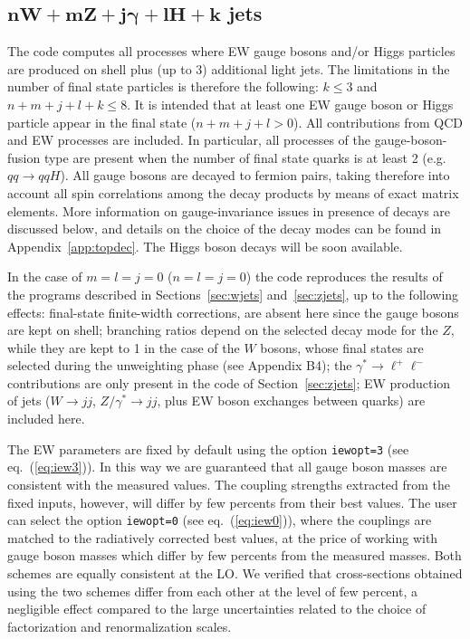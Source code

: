\documentclass[paper]{JHEP3}
\begin{document}
\subsection{$\mathbf{ nW+mZ+j\gamma+lH+k}$ jets}
\label{sec:nw}
The code computes all processes where EW gauge bosons and/or Higgs
particles are produced on shell plus (up to 3) additional light jets.
The limitations in the number of final state particles is therefore
the following: $ k \le 3$ and $n+m+j+l+k \le 8$. It is intended that at
least one EW gauge boson or Higgs particle appear in the final state 
 ($n+m+j+l>0$). All contributions from
QCD and EW processes are included. In particular, all processes of
the gauge-boson-fusion type are present when the number of final state
quarks is at least 2 (e.g. $qq\to qqH$).
All gauge bosons are decayed to fermion pairs, taking therefore into account 
all spin correlations among the decay products by means of exact 
matrix elements. More information on gauge-invariance issues in
presence of decays are discussed below, and details on the choice of
the decay modes can 
be found in Appendix~\ref{app:topdec}. The Higgs boson decays will be soon available. 

In the case of $m=l=j=0$
($n=l=j=0$) the code reproduces the results of the programs described in 
Sections~\ref{sec:wjets} and~\ref{sec:zjets}, up to the following effects:
final-state finite-width corrections, 
are absent here since the gauge bosons are kept on shell; branching
ratios depend on the selected decay mode for the $Z$, while they are
kept to 1 in the case of the $W$ bosons, whose final states are
selected during the unweighting phase (see Appendix B4); 
the $\gamma^* \to \ell^+\ell^- $ contributions are only present in the code
of Section~\ref{sec:zjets}; EW production of jets ($W\to jj$, $Z/\gamma^*
\to jj$, plus EW boson exchanges between quarks) are included here.

The EW parameters are fixed by default using the option {\tt iewopt=3}
(see eq.~(\ref{eq:iew3})). In this way we are guaranteed that all gauge
boson masses are consistent with the measured values. The coupling
strengths extracted from the fixed inputs, however, will differ by few
percents from their best values. The user can select the option 
 {\tt iewopt=0}
(see eq.~(\ref{eq:iew0})), where the couplings are matched to the
radiatively corrected best values, at the price of working with gauge
boson masses which differ by few percents from the measured
masses. Both schemes are equally consistent at the LO. We verified
that cross-sections obtained using the two schemes differ from each
other at the level of few percent, a negligible effect compared to
the large uncertainties related to the choice of factorization and
renormalization scales. 
\end{document}

